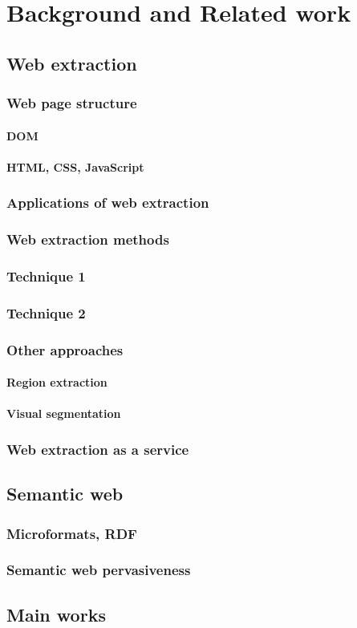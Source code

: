 \chapter{Background and Related work}
\section{Web extraction}
\subsection{Web page structure}
\subsubsection{DOM}
\subsubsection{HTML, CSS, JavaScript}
\subsection{Applications of web extraction}
\subsection{Web extraction methods}
\subsection{Technique 1}
\subsection{Technique 2}
\subsection{Other approaches}
\subsubsection{Region extraction}
\subsubsection{Visual segmentation}
\subsection{Web extraction as a service}
\section{Semantic web}
\subsection{Microformats, RDF}
\subsection{Semantic web pervasiveness}
\section{Main works}


